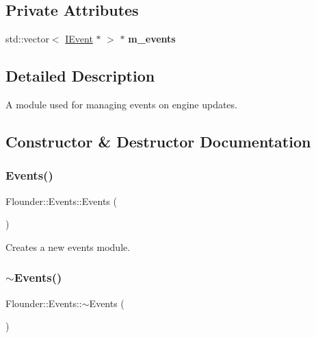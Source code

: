\subsection*{Private Attributes}
\begin{DoxyCompactItemize}
\item 
\mbox{\label{class_flounder_1_1_events_aa16dede3399287b6e870c3f18dee4732}} 
std\+::vector$<$ \hyperlink{class_flounder_1_1_i_event}{I\+Event} $\ast$ $>$ $\ast$ {\bfseries m\+\_\+events}
\end{DoxyCompactItemize}


\subsection{Detailed Description}
A module used for managing events on engine updates. 



\subsection{Constructor \& Destructor Documentation}
\mbox{\label{class_flounder_1_1_events_a25d7a49abd86b07fbd2d51fb2003dbb9}} 
\subsubsection{\texorpdfstring{Events()}{Events()}}
{\footnotesize\ttfamily Flounder\+::\+Events\+::\+Events (\begin{DoxyParamCaption}{ }\end{DoxyParamCaption})}



Creates a new events module. 

\mbox{\label{class_flounder_1_1_events_a944e4b67f8a646f9ab991c2e167bb1e7}} 
\subsubsection{\texorpdfstring{$\sim$\+Events()}{~Events()}}
{\footnotesize\ttfamily Flounder\+::\+Events\+::$\sim$\+Events (\begin{DoxyParamCaption}{ }\end{DoxyParamCaption})}



